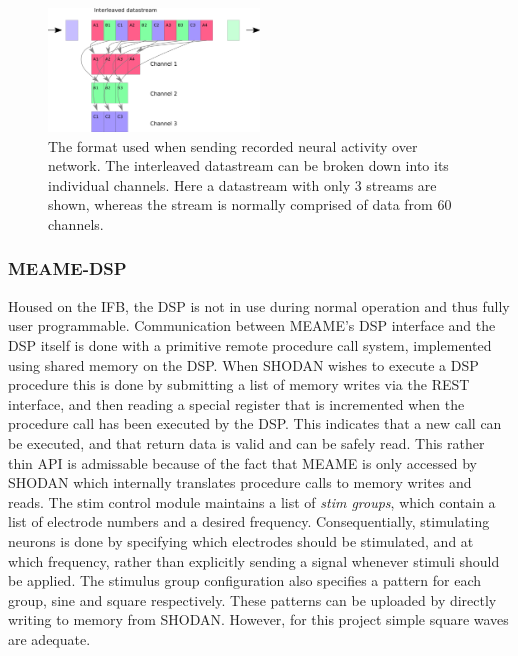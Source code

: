 \begin{figure}[h!]
  \centering
  \includegraphics[width=0.5\textwidth]{fig/reorder.png}
  \caption{
    The format used when sending recorded neural activity over network.
    The interleaved datastream can be broken down into its individual channels.
    Here a datastream with only 3 streams are shown, whereas the stream is
    normally comprised of data from 60 channels.
  }
  \label{figLayout}
\end{figure}
\subsubsection{MEAME-DSP}
Housed on the IFB, the DSP is not in use during normal operation and thus fully
user programmable.
Communication between MEAME's DSP interface and the DSP itself is done with a
primitive remote procedure call system, implemented using shared memory on the
DSP.
When SHODAN wishes to execute a DSP procedure this is done by submitting a list
of memory writes via the REST interface, and then reading a special register
that is incremented when the procedure call has been executed by the DSP.
This indicates that a new call can be executed, and that return data is valid and
can be safely read.
This rather thin API is admissable because of the fact that MEAME is only
accessed by SHODAN which internally translates procedure calls to memory writes
and reads.
The stim control module maintains a list of \emph{stim groups}, which contain a
list of electrode numbers and a desired frequency.
Consequentially, stimulating neurons is done by specifying which electrodes
should be stimulated, and at which frequency, rather than explicitly sending a
signal whenever stimuli should be applied.
The stimulus group configuration also specifies a pattern for each group, sine
and square respectively.
These patterns can be uploaded by directly writing to memory from SHODAN.
However, for this project simple square waves are adequate.

